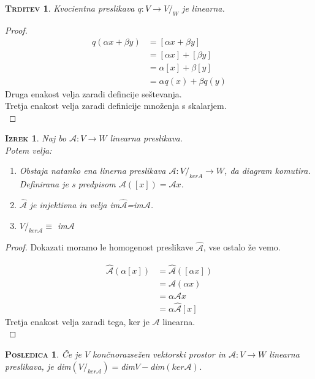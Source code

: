 \documentclass[a4paper,12pt]{article}
\newcommand{\A}{\mathcal{A}}
\newtheorem*{trditev}{\textsc{Trditev}}
\newtheorem*{izrek}{\textsc{Izrek}}
\newtheorem*{posledica}{\textsc{Posledica}}
\begin{document}
\begin{trditev}
	Kvocientna preslikava $q:V\to V/_W$ je linearna.\\
\end{trditev}

\begin{proof}
	\begin{align*}
		q(\alpha x + \beta y) &= [\alpha x + \beta y] \\
		&=[\alpha x]+[\beta y] \\
		&= \alpha[x]+\beta[y] \\
		&= \alpha q (x)+\beta q (y)
	\end{align*}
Druga enakost velja zaradi defincije seštevanja. \\
Tretja enakost velja zaradi definicije množenja s skalarjem.\\
\end{proof}

\newpage 

\begin{izrek}
	Naj bo $\A :V\to W$ linearna preslikava. \\ 

	Potem velja:
	\begin{enumerate}
		\item Obstaja natanko ena linerna preslikava $\A : V/_{kerA} \to W$, da diagram komutira. Definirana je s predpisom $\A ([x])=\A x$.
		\item $\hat{\A}$ je injektivna in velja im$\hat{\A}$=im$\A$.
		\item $V/_{ker \A}\equiv$ im$\A$\\
		\end{enumerate}
\end{izrek}

\begin{proof}
	Dokazati moramo le homogenost preslikave $\hat{\A}$, vse ostalo že vemo.

	\begin{align*}
		\hat{\A}(\alpha[x])&=\hat{\A}([\alpha x]) \\
		&= \A (\alpha x) \\
		&= \alpha \A x \\
		&= \alpha \hat{\A} [x]
	\end{align*}
	Tretja enakost velja zaradi tega, ker je $\A$ linearna. \\
\end{proof}

\begin{posledica}
	Če je $V$ končnorazsežen vektorski prostor in $\A :V\to W$ linearna preslikava, je dim$(V/_{ker \A })=$dim$V-$dim$(ker \A)$.\\
\end{posledica}
\end{document}
